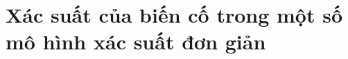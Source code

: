 \chapter{Xác suất của biến cố trong một số mô hình xác suất đơn giản}


\setcounter{section}{24}




